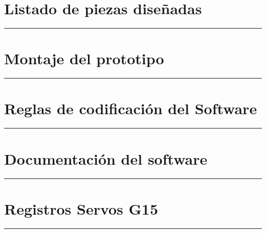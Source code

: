 \appendix
{}


     \chapter{Listado de piezas diseñadas} \label{app:listadoPiezas}
         \hrule
         \vspace{3mm}
     	 
    	
     \chapter{Montaje del prototipo} \label{app:montajePiezas}
         \hrule
         \vspace{3mm}
    	
     \chapter{Reglas de codificación del Software} \label{app:codificacionSW}
        \hrule
        \vspace{3mm}
     	
    
     \chapter{Documentación del software} \label{app:documentacion_software}
         \hrule
         \vspace{3mm}
     	 
     	 
     \chapter{Registros Servos G15} \label{app:registros_g15}
	     \hrule
	     \vspace{3mm}
	     
        
